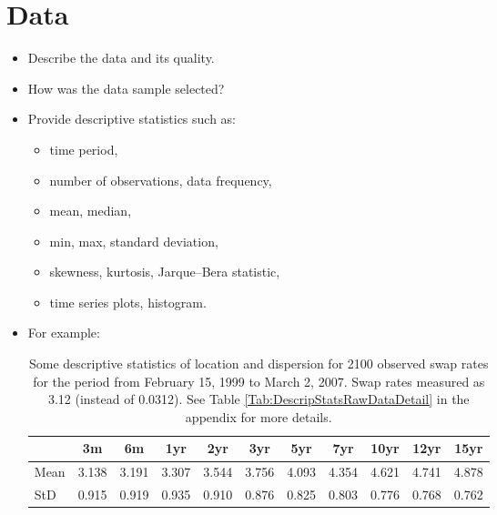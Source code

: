 \documentclass[a4paper,11pt]{article}\usepackage[]{graphicx}\usepackage[]{color}
\begin{document}
\newpage





\section{Data}\label{Sec:Data}

\begin{itemize}

    \item Describe the data and its quality.
    \item How was the data sample selected?
    \item Provide descriptive statistics such as:
        \begin{itemize}
            \item time period,
            \item number of observations, data frequency,
            \item mean, median,
            \item min, max, standard deviation,
            \item skewness, kurtosis, Jarque--Bera statistic,
            \item time series plots, histogram.
        \end{itemize}
    \item For example:
        \begin{table}[ht]
        \begin{center}
            {\footnotesize
            \begin{tabular}{l|cccccccccc}
                \hline \hline
                           & 3m    & 6m    & 1yr   & 2yr   & 3yr   & 5yr   & 7yr   & 10yr  & 12yr  & 15yr   \\
                \hline
                    Mean   & 3.138 & 3.191 & 3.307 & 3.544 & 3.756 & 4.093 & 4.354 & 4.621 & 4.741 & 4.878  \\
                    StD    & 0.915 & 0.919 & 0.935 & 0.910 & 0.876 & 0.825 & 0.803 & 0.776 & 0.768 & 0.762  \\
                \hline \hline
            \end{tabular}}
        \end{center}
        \caption{Some descriptive statistics of location and dispersion for
        2100 observed swap rates for the period from February 15, 1999
        to March 2, 2007. Swap rates measured as 3.12 (instead of 0.0312). See Table
        \ref{Tab:DescripStatsRawDataDetail} in the appendix for
        more details.}
        \label{Tab:DescripStatsRawData}
        \end{table}


\end{itemize}
\end{document}
